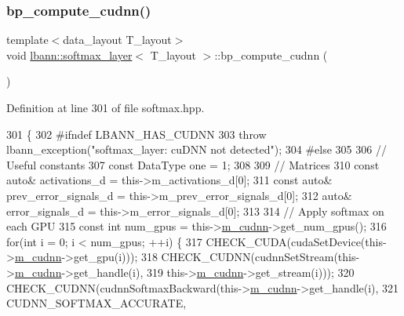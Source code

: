 \subsubsection{\texorpdfstring{bp\+\_\+compute\+\_\+cudnn()}{bp\_compute\_cudnn()}}
{\footnotesize\ttfamily template$<$data\+\_\+layout T\+\_\+layout$>$ \\
void \hyperlink{classlbann_1_1softmax__layer}{lbann\+::softmax\+\_\+layer}$<$ T\+\_\+layout $>$\+::bp\+\_\+compute\+\_\+cudnn (\begin{DoxyParamCaption}{ }\end{DoxyParamCaption})\hspace{0.3cm}{\ttfamily [inline]}}



Definition at line 301 of file softmax.\+hpp.


\begin{DoxyCode}
301                           \{
302 \textcolor{preprocessor}{  #ifndef LBANN\_HAS\_CUDNN}
303     \textcolor{keywordflow}{throw} lbann\_exception(\textcolor{stringliteral}{"softmax\_layer: cuDNN not detected"});
304 \textcolor{preprocessor}{  #else}
305     
306     \textcolor{comment}{// Useful constants}
307     \textcolor{keyword}{const} DataType one = 1;
308 
309     \textcolor{comment}{// Matrices}
310     \textcolor{keyword}{const} \textcolor{keyword}{auto}& activations\_d = this->m\_activations\_d[0];
311     \textcolor{keyword}{const} \textcolor{keyword}{auto}& prev\_error\_signals\_d = this->m\_prev\_error\_signals\_d[0];
312     \textcolor{keyword}{auto}& error\_signals\_d = this->m\_error\_signals\_d[0];
313 
314     \textcolor{comment}{// Apply softmax on each GPU}
315     \textcolor{keyword}{const} \textcolor{keywordtype}{int} num\_gpus = this->\hyperlink{classlbann_1_1Layer_a08dbb94239e3b8c96329786c57c72e21}{m\_cudnn}->get\_num\_gpus();
316     \textcolor{keywordflow}{for}(\textcolor{keywordtype}{int} i = 0; i < num\_gpus; ++i) \{
317       CHECK\_CUDA(cudaSetDevice(this->\hyperlink{classlbann_1_1Layer_a08dbb94239e3b8c96329786c57c72e21}{m\_cudnn}->get\_gpu(i)));
318       CHECK\_CUDNN(cudnnSetStream(this->\hyperlink{classlbann_1_1Layer_a08dbb94239e3b8c96329786c57c72e21}{m\_cudnn}->get\_handle(i),
319                                  this->\hyperlink{classlbann_1_1Layer_a08dbb94239e3b8c96329786c57c72e21}{m\_cudnn}->get\_stream(i)));
320       CHECK\_CUDNN(cudnnSoftmaxBackward(this->\hyperlink{classlbann_1_1Layer_a08dbb94239e3b8c96329786c57c72e21}{m\_cudnn}->get\_handle(i),
321                                        CUDNN\_SOFTMAX\_ACCURATE,

\end{DoxyCode}
